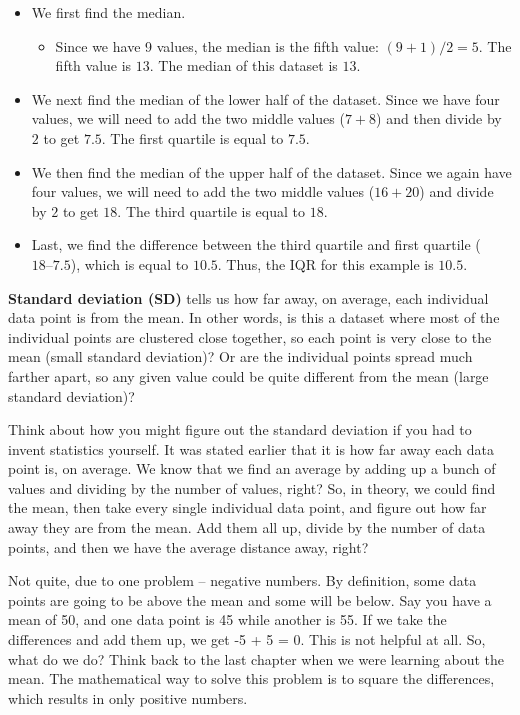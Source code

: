 \documentclass[
  letterpaper,
  DIV=11,
  numbers=noendperiod]{scrreprt}
\providecommand{\tightlist}{%
  \setlength{\itemsep}{0pt}\setlength{\parskip}{0pt}}
\begin{document}
\begin{itemize}
\item
  We first find the median.

  \begin{itemize}
  \tightlist
  \item
    Since we have 9 values, the median is the fifth value:
    \((9+1)/2 = 5\). The fifth value is \(13\). The median of this
    dataset is \(13\).
  \end{itemize}
\item
  We next find the median of the lower half of the dataset. Since we
  have four values, we will need to add the two middle values
  (\(7 + 8\)) and then divide by \(2\) to get \(7.5\). The first
  quartile is equal to \(7.5\).
\item
  We then find the median of the upper half of the dataset. Since we
  again have four values, we will need to add the two middle values
  (\(16 + 20\)) and divide by \(2\) to get \(18\). The third quartile is
  equal to \(18\).
\item
  Last, we find the difference between the third quartile and first
  quartile (\(18 – 7.5\)), which is equal to \(10.5\). Thus, the IQR for
  this example is \(10.5\).
\end{itemize}

\textbf{Standard deviation (SD)} tells us how far away, on average, each
individual data point is from the mean. In other words, is this a
dataset where most of the individual points are clustered close
together, so each point is very close to the mean (small standard
deviation)? Or are the individual points spread much farther apart, so
any given value could be quite different from the mean (large standard
deviation)?

Think about how you might figure out the standard deviation if you had
to invent statistics yourself. It was stated earlier that it is how far
away each data point is, on average. We know that we find an average by
adding up a bunch of values and dividing by the number of values, right?
So, in theory, we could find the mean, then take every single individual
data point, and figure out how far away they are from the mean. Add them
all up, divide by the number of data points, and then we have the
average distance away, right?

Not quite, due to one problem -- negative numbers. By definition, some
data points are going to be above the mean and some will be below. Say
you have a mean of 50, and one data point is 45 while another is 55. If
we take the differences and add them up, we get -5 + 5 = 0. This is not
helpful at all. So, what do we do? Think back to the last chapter when
we were learning about the mean. The mathematical way to solve this
problem is to square the differences, which results in only positive
numbers.
\end{document}

